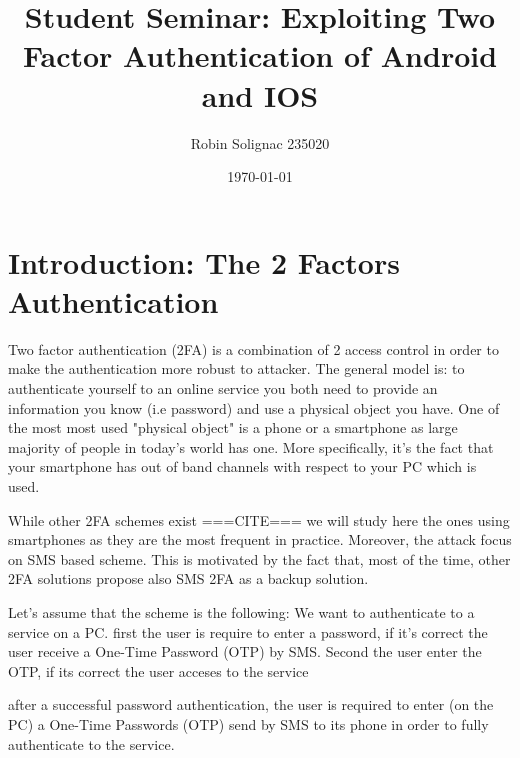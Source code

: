 \documentclass[11pt, a4paper,twocolumn]{article}
\title{Student Seminar: Exploiting Two Factor Authentication of Android and IOS}
\author{Robin Solignac 235020}
\date{\today}
\begin{document}
\maketitle
\begin{comment}
\begin{abstract}
Applications  which  can  be  used  in  different  platforms  now  use  two
factor authentication (2FA) to allow users to conveniently switch from one platform to another.
For example, when a user tries to login his gmail, it is not enough to enter correct password 
(first factor), it is also necessary to enter a PIN which is received by an SMS (second factor).
The aim of this project explaining the attacks against 2FA in IOS and Android devices and 
what can be the solutions. 
\end{abstract}
\end{comment}

\section{Introduction: The 2 Factors Authentication}

Two factor authentication (2FA) is a combination of 2 access control  in order to make the authentication more robust to attacker. The general model is: to authenticate yourself to an online service you both need to provide an information you know (i.e password) and use a physical object you have. 
One of the most most used "physical object" is a phone or a smartphone as large majority of people in today's world has one.
More specifically, it's the fact that your smartphone has out of band channels with respect to your PC which is used.

While other 2FA schemes exist ===CITE=== we will study here the ones using smartphones as they are the most frequent in practice. Moreover, the attack focus on SMS based scheme.
This is motivated by the fact that, most of the time, other 2FA solutions  propose also SMS 2FA as a backup solution.

Let's assume that the scheme is the following: We want to authenticate to a service on a PC. first the user is require to enter a password, if it's correct the user receive a One-Time Password (OTP) by SMS. Second the user enter the OTP, if its correct the user acceses to the service

after a successful password authentication, the user is required to enter (on the PC) a One-Time Passwords (OTP) send by SMS to its phone in order to fully authenticate to the service. 
\end{document}

